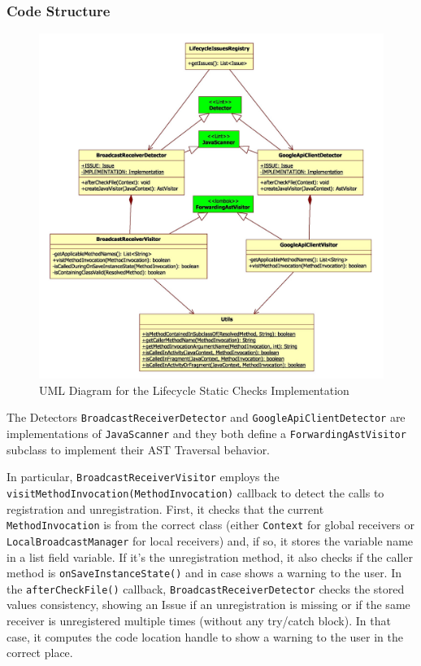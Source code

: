 \documentclass[11pt,a4paper,notitlepage]{article}
\begin{document}
\subsubsection{Code Structure}
\begin{figure}
  \centering
  \includegraphics[width=\textwidth]{Images/LifecycleSta/UML/Implementation.jpg}
  \caption[Lifecycle Static Checks Implementation UML]{UML Diagram for the Lifecycle Static Checks Implementation}
\end{figure}
The Detectors \texttt{BroadcastReceiverDetector} and \texttt{GoogleApiClientDetector} are implementations of \texttt{JavaScanner} and they both define a \texttt{ForwardingAstVisitor} subclass to implement their AST Traversal behavior.

In particular, \texttt{BroadcastReceiverVisitor} employs the \texttt{visitMethodInvocation(MethodInvocation)} callback to detect the calls to registration and unregistration. First, it checks that the current \texttt{MethodInvocation} is from the correct class (either \texttt{Context} for global receivers or \texttt{LocalBroadcastManager} for local receivers) and, if so, it stores the variable name in a list field variable. If it's the unregistration method, it also checks if the caller method is \texttt{onSaveInstanceState()} and in case shows a warning to the user. In the \texttt{afterCheckFile()} callback,  \texttt{BroadcastReceiverDetector} checks the stored values consistency, showing an Issue if an unregistration is missing or if the same receiver is unregistered multiple times (without any try/catch block). In that case, it computes the code location handle to show a warning to the user in the correct place.
\end{document}
